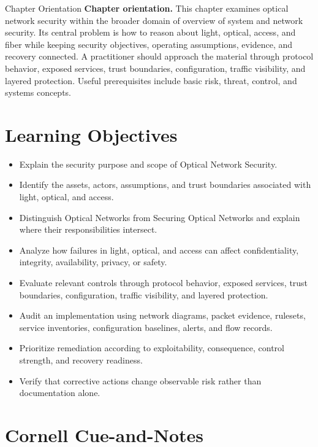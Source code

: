 \documentclass[11pt,letterpaper]{article}
\title{\CornellDocumentTitle}
\author{}
\date{}
\begin{document}
\maketitle
\begin{CornellOverviewBox}{Chapter Orientation}
\textbf{Chapter orientation.} This chapter examines optical network security within the broader domain of overview of system and network security. Its central problem is how to reason about light, optical, access, and fiber while keeping security objectives, operating assumptions, evidence, and recovery connected. A practitioner should approach the material through protocol behavior, exposed services, trust boundaries, configuration, traffic visibility, and layered protection. Useful prerequisites include basic risk, threat, control, and systems concepts.
\end{CornellOverviewBox}
\section*{Learning Objectives}
\begin{itemize}
\item Explain the security purpose and scope of Optical Network Security.
\item Identify the assets, actors, assumptions, and trust boundaries associated with light, optical, and access.
\item Distinguish Optical Networks from Securing Optical Networks and explain where their responsibilities intersect.
\item Analyze how failures in light, optical, and access can affect confidentiality, integrity, availability, privacy, or safety.
\item Evaluate relevant controls through protocol behavior, exposed services, trust boundaries, configuration, traffic visibility, and layered protection.
\item Audit an implementation using network diagrams, packet evidence, rulesets, service inventories, configuration baselines, alerts, and flow records.
\item Prioritize remediation according to exploitability, consequence, control strength, and recovery readiness.
\item Verify that corrective actions change observable risk rather than documentation alone.
\end{itemize}
\section*{Cornell Cue-and-Notes}
\end{document}
